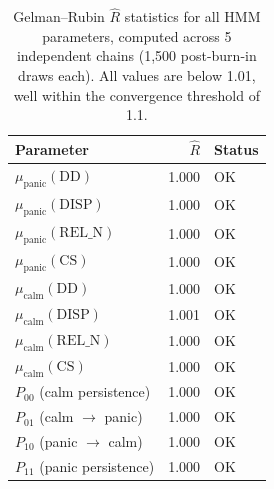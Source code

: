 \begin{table}[H]
\centering
\small
\begin{tabular}{l r l}
\toprule
Parameter & $\hat{R}$ & Status \\
\midrule
$\mu_{\text{panic}}(\text{DD})$ & 1.000 & OK \\
$\mu_{\text{panic}}(\text{DISP})$ & 1.000 & OK \\
$\mu_{\text{panic}}(\text{REL\_N})$ & 1.000 & OK \\
$\mu_{\text{panic}}(\text{CS})$ & 1.000 & OK \\
$\mu_{\text{calm}}(\text{DD})$ & 1.000 & OK \\
$\mu_{\text{calm}}(\text{DISP})$ & 1.001 & OK \\
$\mu_{\text{calm}}(\text{REL\_N})$ & 1.000 & OK \\
$\mu_{\text{calm}}(\text{CS})$ & 1.000 & OK \\
$P_{00}$ (calm persistence) & 1.000 & OK \\
$P_{01}$ (calm $\to$ panic) & 1.000 & OK \\
$P_{10}$ (panic $\to$ calm) & 1.000 & OK \\
$P_{11}$ (panic persistence) & 1.000 & OK \\
\bottomrule
\end{tabular}
\caption{Gelman--Rubin $\hat{R}$ statistics for all HMM parameters, computed across 5 independent chains (1{,}500 post-burn-in draws each). All values are below 1.01, well within the convergence threshold of 1.1.}
\label{tab:gelman_rubin}
\end{table}
